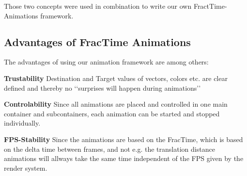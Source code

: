  Those two concepts were used in combination to write our own FractTime-Animations framework.\\
 
 \subsection{Advantages of FracTime Animations}
 The advantages of using our animation framework are among others:
 \begin{description}
 \item{\textbf{Trustability}} Destination and Target values of vectors, colors etc. are clear defined and thereby no \lq\lq{}surprises will happen during animations\rq\rq{}
 \item{\textbf{Controlability}} Since all animations are placed and controlled in one main container and subcontainers, each animation can be started and stopped individually.
 \item{\textbf{FPS-Stability}} Since the animations are based on the FracTime, which is based on the delta time between frames, and not e.g. the translation distance animations will allways take the same time independent of the FPS given by the render system.
 \end{description}